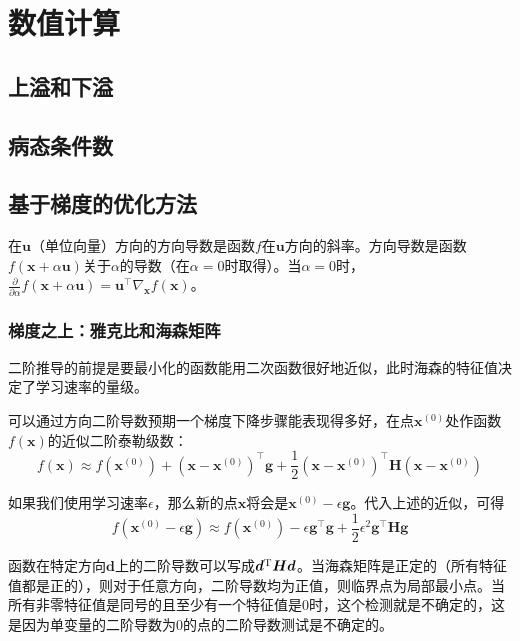 \chapter{数值计算}
    \section{上溢和下溢}
    \section{病态条件数}
    \section{基于梯度的优化方法}
        在$\bm{u}$（单位向量）方向的方向导数是函数$f$在$\bm{u}$方向的斜率。方向导数是函数$f(\bm{x} + \alpha \bm{u})$关于$\alpha$的导数（在$\alpha = 0$时取得）。当$\alpha =  0$时，$\frac{\partial }{{\partial \alpha }}f(\bm{x} + \alpha \bm{u}) = {\bm{u}^\top}{\nabla _{\bm{x}}}f(\bm{x})$。
        
        \subsection{梯度之上：雅克比和海森矩阵}
            二阶推导的前提是要最小化的函数能用二次函数很好地近似，此时海森的特征值决定了学习速率的量级。
            
            可以通过方向二阶导数预期一个梯度下降步骤能表现得多好，在点$\bm{x}^{(0)}$处作函数$f(\bm{x})$的近似二阶泰勒级数：
            \begin{equation}
              f(\bm{x}) \approx f({\bm{x}^{(0)}}) + {(\bm{x} - {\bm{x}^{(0)}})^\top}\bm{g} + \frac{1}{2}{(\bm{x} - {\bm{x}^{(0)}})^\top}\bm{H}(\bm{x} - {\bm{x}^{(0)}})
            \end{equation}
            
            如果我们使用学习速率$\epsilon$，那么新的点$\bm{x}$将会是$\bm{x}^(0) - \epsilon \bm{g}$。代入上述的近似，可得
            \begin{equation}
              f(\bm{x}^{(0)} - \epsilon \bm{g}) \approx f(\bm{x}^{(0)}) - \epsilon \bm{g}^\top\bm{g} + \frac{1}{2} \epsilon^2 \bm{g}^\top\bm{H}\bm{g}
            \end{equation}
            
            函数在特定方向${\bm{d}}$上的二阶导数可以写成${{\bm{d}}^{\mathop{\rm T}\nolimits} }{\bm{Hd}}$。当海森矩阵是正定的（所有特征值都是正的），则对于任意方向，二阶导数均为正值，则临界点为局部最小点。当所有非零特征值是同号的且至少有一个特征值是0时，这个检测就是不确定的，这是因为单变量的二阶导数为0的点的二阶导数测试是不确定的。
            
